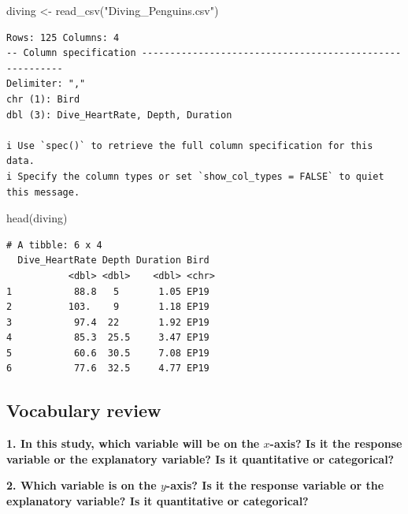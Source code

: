 \documentclass[
  letterpaper,
  DIV=11,
  numbers=noendperiod]{scrartcl}
\newenvironment{Shaded}{\begin{snugshade}}{\end{snugshade}}
\newcommand{\FunctionTok}[1]{\textcolor[rgb]{0.28,0.35,0.67}{#1}}
\newcommand{\NormalTok}[1]{\textcolor[rgb]{0.00,0.23,0.31}{#1}}
\newcommand{\OtherTok}[1]{\textcolor[rgb]{0.00,0.23,0.31}{#1}}
\newcommand{\StringTok}[1]{\textcolor[rgb]{0.13,0.47,0.30}{#1}}
\begin{document}
\begin{Shaded}
\begin{Highlighting}[]
\NormalTok{diving }\OtherTok{\textless{}{-}} \FunctionTok{read\_csv}\NormalTok{(}\StringTok{"Diving\_Penguins.csv"}\NormalTok{)}
\end{Highlighting}
\end{Shaded}

\begin{verbatim}
Rows: 125 Columns: 4
-- Column specification --------------------------------------------------------
Delimiter: ","
chr (1): Bird
dbl (3): Dive_HeartRate, Depth, Duration

i Use `spec()` to retrieve the full column specification for this data.
i Specify the column types or set `show_col_types = FALSE` to quiet this message.
\end{verbatim}

\begin{Shaded}
\begin{Highlighting}[]
\FunctionTok{head}\NormalTok{(diving)}
\end{Highlighting}
\end{Shaded}

\begin{verbatim}
# A tibble: 6 x 4
  Dive_HeartRate Depth Duration Bird 
           <dbl> <dbl>    <dbl> <chr>
1           88.8   5       1.05 EP19 
2          103.    9       1.18 EP19 
3           97.4  22       1.92 EP19 
4           85.3  25.5     3.47 EP19 
5           60.6  30.5     7.08 EP19 
6           77.6  32.5     4.77 EP19 
\end{verbatim}

\hypertarget{vocabulary-review}{%
\subsection{Vocabulary review}\label{vocabulary-review}}

\textbf{1. In this study, which variable will be on the \(x\)-axis? Is
it the response variable or the explanatory variable? Is it quantitative
or categorical?}


\vspace{1cm}

\textbf{2. Which variable is on the \(y\)-axis? Is it the response
variable or the explanatory variable? Is it quantitative or
categorical?}
\end{document}
